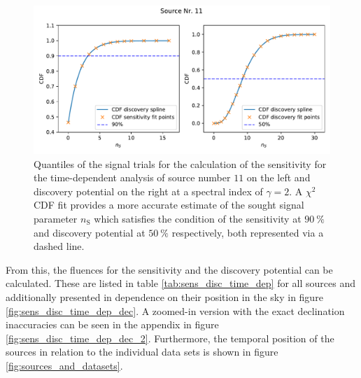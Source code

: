 \begin{figure}
    \centering
    \includegraphics[width=\linewidth]{Plots/05_csky/9_years_gfu_gold_time_dep_cdf_1.pdf}
    \caption{Quantiles of the signal trials for the calculation of the sensitivity for the time-dependent analysis of source number $\num{11}$ on the left and discovery potential on the right at a spectral index of $\gamma=\num{2}$. A $\chi^2$ CDF fit provides a more accurate estimate of the sought signal parameter $n_\text{S}$ which satisfies the condition of the sensitivity at $\SI{90}{\percent}$ and discovery potential at $\SI{50}{\percent}$ respectively, both represented via a dashed line.}
    \label{fig:time_dep_cdf_sens_disc_1}
\end{figure}
From this, the fluences for the sensitivity and the discovery potential can be calculated.
These are listed in table \ref{tab:sens_disc_time_dep} for all sources and additionally presented in dependence on their position in the sky in figure \ref{fig:sens_disc_time_dep_dec}.
A zoomed-in version with the exact declination inaccuracies can be seen in the appendix in figure \ref{fig:sens_disc_time_dep_dec_2}.
Furthermore, the temporal position of the sources in relation to the individual data sets is shown in figure \ref{fig:sources_and_datasets}.

